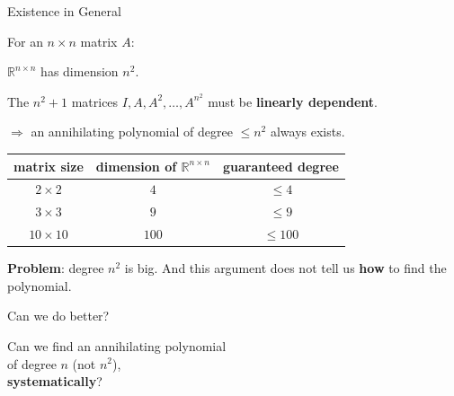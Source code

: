 \documentclass[10pt]{beamer}
\theoremstyle{definition}
\newcommand{\x}[1]{\alert{\textbf{#1}}}
\begin{document}
\begin{frame}{Existence in General}

For an $n \times n$ matrix $A$:

\vfill

$\mathbb{R}^{n \times n}$ has dimension $n^2$.

\vfill

The $n^2 + 1$ matrices $I, A, A^2, \ldots, A^{n^2}$ must be \x{linearly dependent}.

\vfill

$\Longrightarrow$ an annihilating polynomial of degree $\leq n^2$ always exists.

\vfill

\begin{center}
\renewcommand{\arraystretch}{1.4}
\begin{tabular}{c|c|c}
matrix size & dimension of $\mathbb{R}^{n\times n}$ & guaranteed degree \\
\hline
$2 \times 2$ & $4$ & $\leq 4$ \\
$3 \times 3$ & $9$ & $\leq 9$ \\
$10 \times 10$ & $100$ & $\leq 100$
\end{tabular}
\end{center}

\vfill

\x{Problem}: degree $n^2$ is big. And this argument does not tell us
\x{how} to find the polynomial.

Can we do better?
\vfill
\end{frame}


\begin{frame}{}
\vfill
\begin{center}
{\Large Can we find an annihilating polynomial\\[6pt]
of degree $n$ (not $n^2$),\\[6pt]
\x{systematically}?}
\end{center}
\vfill
\end{frame}
\end{document}
